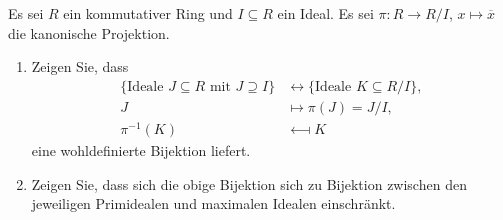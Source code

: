 \begin{question}[subtitle = Ideale in Quotienten]
  \label{question: lattice isomorphism for quotients}
  Es sei $R$ ein kommutativer Ring und $I \subseteq R$ ein Ideal.
  Es sei $\pi \colon R \to R/I$, $x \mapsto \overline{x}$ die kanonische Projektion.
  \begin{enumerate}
    \item
      Zeigen Sie, dass
      \begin{align*}
                              \{ \text{Ideale $J \subseteq R$ mit $J \supseteq I$} \}
        &\longleftrightarrow  \{ \text{Ideale $K \subseteq R/I$} \},
        \\
                      J
        &\longmapsto  \pi(J) = J/I,
        \\
                        \pi^{-1}(K)
        &\longmapsfrom  K
      \end{align*}
      eine wohldefinierte Bijektion liefert.
    \item
      Zeigen Sie, dass sich die obige Bijektion sich zu Bijektion zwischen den jeweiligen Primidealen und maximalen Idealen einschränkt.
  \end{enumerate}
\end{question}



